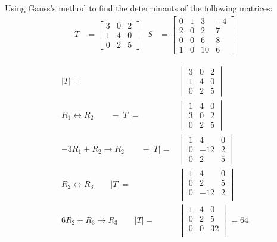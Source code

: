 \begin{example} \label{ex:det:gauss}
Using Gauss's method to find the determinants of the following matrices:
%
\begin{align*}
T & = \begin{bmatrix}
3 & 0 & 2 \\
1 & 4 & 0 \\
0 & 2 & 5
\end{bmatrix} & S & = \begin{bmatrix}
0 & 1 & 3  & -4 \\
2 & 0 & 2 & 7 \\
0 & 0 & 6 & 8 \\
1 & 0 & 10 & 6
\end{bmatrix}
\end{align*}

\solution

\begin{align*}
|T|  = & \begin{vmatrix}
3 & 0 & 2 \\
1 & 4 & 0 \\
0 & 2 & 5
\end{vmatrix}\\
R_1 \leftrightarrow R_2  \qquad -|T|= &  \begin{vmatrix}
1 & 4 & 0 \\
3 & 0 & 2 \\
0 & 2 & 5
\end{vmatrix} \\
-3 R_1 + R_2 \rightarrow R_2 \qquad -|T|  = &
 \begin{vmatrix}
1 & 4 & 0 \\
0 & -12 & 2 \\
0 & 2 & 5
\end{vmatrix} \\
R_2 \leftrightarrow R_3 \qquad  |T|= &
 \begin{vmatrix}
1 & 4 & 0 \\
0 & 2 & 5 \\
0 & -12 & 2 \\
\end{vmatrix} \\
6 R_2 + R_3 \rightarrow R_3 \qquad |T| = &
 \begin{vmatrix}
1 & 4 & 0 \\
0 & 2 & 5 \\
0 & 0 & 32 \\
\end{vmatrix} = 64
\end{align*}


\end{example}
